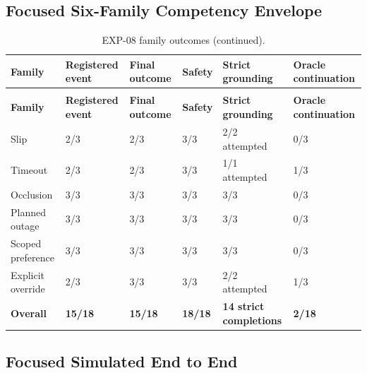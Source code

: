 \documentclass{article}
\begin{document}
\subsection{Focused Six-Family Competency Envelope}

{\small
\renewcommand{\arraystretch}{1.12}
\begin{longtable}{@{}P{2.50cm}P{2.10cm}P{2.10cm}P{2.10cm}P{2.20cm}P{2.80cm}@{}}
    \caption{EXP-08 family-level outcomes.}
    \label{tab:app-competency-envelope} \\
    \toprule
    \textbf{Family} & \textbf{Registered event} & \textbf{Final outcome} &
    \textbf{Safety} & \textbf{Strict grounding} & \textbf{Oracle continuation} \\
    \midrule
    \endfirsthead
    \caption[]{EXP-08 family outcomes (continued).} \\
    \toprule
    \textbf{Family} & \textbf{Registered event} & \textbf{Final outcome} &
    \textbf{Safety} & \textbf{Strict grounding} & \textbf{Oracle continuation} \\
    \midrule
    \endhead
    \bottomrule
    \endlastfoot
    Slip & 2/3 & 2/3 & 3/3 & 2/2 attempted & 0/3 \\
    Timeout & 2/3 & 2/3 & 3/3 & 1/1 attempted & 1/3 \\
    Occlusion & 3/3 & 3/3 & 3/3 & 3/3 & 0/3 \\
    Planned outage & 3/3 & 3/3 & 3/3 & 3/3 & 0/3 \\
    Scoped preference & 3/3 & 3/3 & 3/3 & 3/3 & 0/3 \\
    Explicit override & 2/3 & 3/3 & 3/3 & 2/2 attempted & 1/3 \\
    \textbf{Overall} & \textbf{15/18} & \textbf{15/18} & \textbf{18/18} &
    \textbf{14 strict completions} & \textbf{2/18} \\
\end{longtable}
}

\subsection{Focused Simulated End to End}
\end{document}
